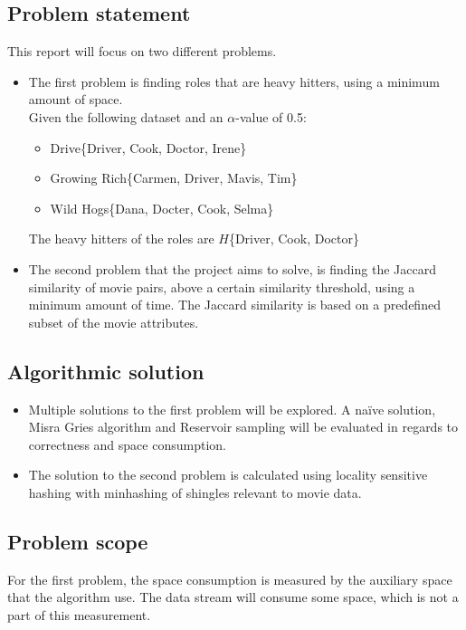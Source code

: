 \subsection{Problem statement}
	This report will focus on two different problems.
\begin{itemize}
	\item The first problem is finding roles that are heavy hitters, using a minimum amount of space. \\ %
	Given the following dataset and an \(\alpha\)-value of 0.5:
	\begin{itemize}
		\item Drive\{Driver, Cook, Doctor, Irene\}
		\item Growing Rich\{Carmen, Driver, Mavis, Tim\}
		\item Wild Hogs\{Dana, Docter, Cook, Selma\}
	\end{itemize}
	The heavy hitters of the roles are \(H\)\{Driver, Cook, Doctor\}
	\item The second problem that the project aims to solve, is finding the Jaccard similarity of movie pairs, above a certain similarity threshold, using a minimum amount of time. The Jaccard similarity is based on a predefined subset of the movie attributes.
	
\end{itemize}

\subsection{Algorithmic solution}
\begin{itemize}
	\item Multiple solutions to the first problem will be explored. A naïve solution, Misra Gries algorithm and Reservoir sampling will be evaluated in regards to correctness and space consumption.
	\item The solution to the second problem is calculated using locality sensitive hashing with minhashing of shingles relevant to movie data.
\end{itemize}

\subsection{Problem scope}
For the first problem, the space consumption is measured by the auxiliary space that the algorithm use. The data stream will consume some space, which is not a part of this measurement.

